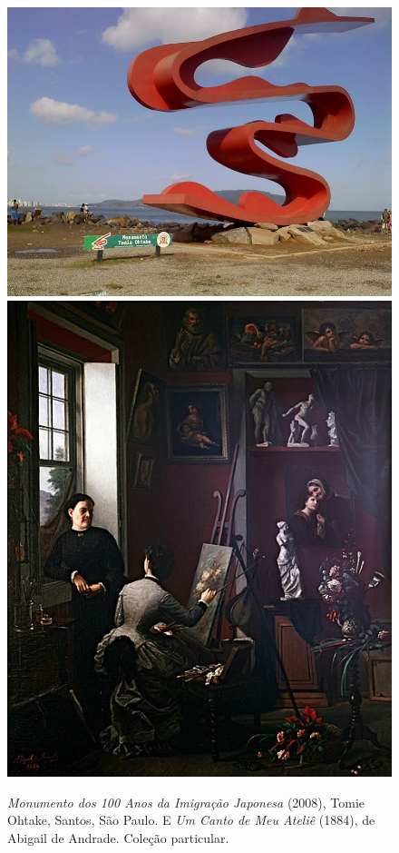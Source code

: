 \begin{figure}[htpb!]
\includegraphics[width=.5\textwidth]{./imgs/art4c.jpg}
\includegraphics[width=.5\textwidth]{./imgs/art4d.jpg}
\caption{\emph{Monumento dos 100 Anos da Imigração Japonesa} (2008), Tomie Ohtake, Santos, São Paulo. E \emph{Um Canto de Meu Ateliê} (1884), de Abigail de Andrade. Coleção particular.}
\end{figure}

